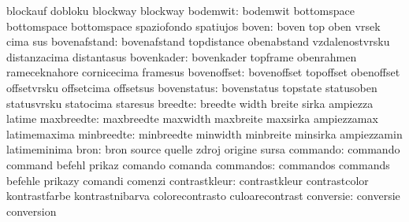                            blockauf                  dobloku
                           blockway                  blockway %
                 bodemwit: bodemwit                  bottomspace
                           bottomspace               bottomspace
                           spaziofondo               spatiujos
                    boven: boven                     top
                           oben                      vrsek
                           cima                      sus
             bovenafstand: bovenafstand              topdistance
                           obenabstand               vzdalenostvrsku
                           distanzacima              distantasus
               bovenkader: bovenkader                topframe
                           obenrahmen                rameceknahore
                           cornicecima               framesus
              bovenoffset: bovenoffset               topoffset
                           obenoffset                offsetvrsku
                           offsetcima                offsetsus
              bovenstatus: bovenstatus               topstate
                           statusoben                statusvrsku
                           statocima                 staresus
                  breedte: breedte                   width
                           breite                    sirka
                           ampiezza                  latime
               maxbreedte: maxbreedte                maxwidth
                           maxbreite                 maxsirka
                           ampiezzamax               latimemaxima
               minbreedte: minbreedte                minwidth
                           minbreite                 minsirka
                           ampiezzamin               latimeminima %
                     bron: bron                      source
                           quelle                    zdroj
                           origine                   sursa
                 commando: commando                  command
                           befehl                    prikaz
                           comando                   comanda
                commandos: commandos                 commands
                           befehle                   prikazy
                           comandi                   comenzi
            contrastkleur: contrastkleur             contrastcolor
                           kontrastfarbe             kontrastnibarva
                           colorecontrasto           culoarecontrast
                conversie: conversie                 conversion
